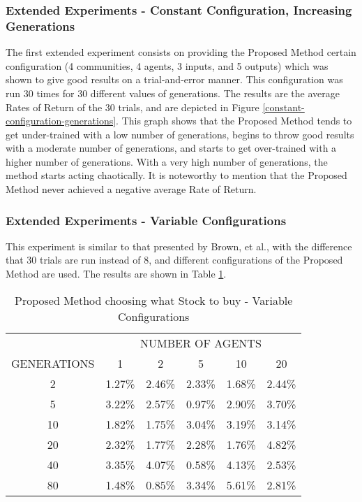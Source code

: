 \subsubsection{Extended Experiments - Constant Configuration, Increasing Generations}

The first extended experiment consists on providing the Proposed Method certain configuration (4 communities, 4 agents, 3 inputs, and 5 outputs) which was shown to give good results on a trial-and-error manner. This configuration was run 30 times for 30 different values of generations. The results are the average Rates of Return of the 30 trials, and are depicted in Figure \ref{constant-configuration-generations}. This graph shows that the Proposed Method tends to get under-trained with a low number of generations, begins to throw good results with a moderate number of generations, and starts to get over-trained with a higher number of generations. With a very high number of generations, the method starts acting chaotically. It is noteworthy to mention that the Proposed Method never achieved a negative average Rate of Return.

\subsubsection{Extended Experiments - Variable Configurations}

This experiment is similar to that presented by Brown, et al., with the difference that 30 trials are run instead of 8, and different configurations of the Proposed Method are used. The results are shown in Table \ref{table-rates-of-return}.

\begin{table}
\caption{Proposed Method choosing what Stock to buy - Variable Configurations}
\label{table-rates-of-return}
    \begin{tabular}{ c c c c c c }
         & \multicolumn{5}{c}{NUMBER OF AGENTS} \\ 
        GENERATIONS & 1      & 2      & 5      & 10     & 20     \\
            2       & 1.27\% & 2.46\% & 2.33\% & 1.68\% & 2.44\% \\ 
            5       & 3.22\% & 2.57\% & 0.97\% & 2.90\% & 3.70\% \\ 
            10      & 1.82\% & 1.75\% & 3.04\% & 3.19\% & 3.14\% \\ 
            20      & 2.32\% & 1.77\% & 2.28\% & 1.76\% & 4.82\% \\ 
            40      & 3.35\% & 4.07\% & 0.58\% & 4.13\% & 2.53\% \\ 
            80      & 1.48\% & 0.85\% & 3.34\% & 5.61\% & 2.81\% \\ 
    \end{tabular} 
\end{table}

